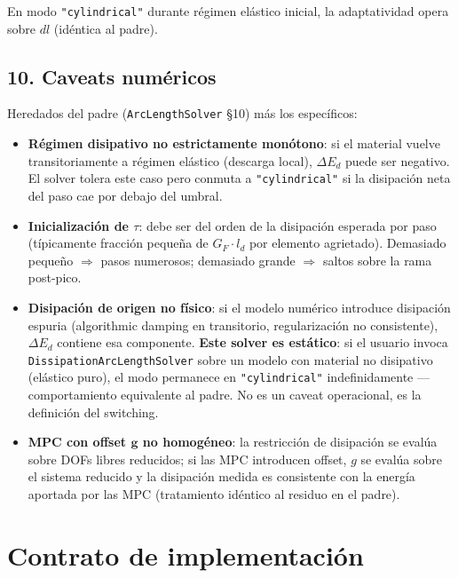 \documentclass[11pt,letterpaper,oneside]{report}
\begin{document}
En modo \texttt{"cylindrical"} durante régimen elástico inicial, la adaptatividad opera sobre $dl$ (idéntica al padre).

\subsection{10. Caveats numéricos}

Heredados del padre (\texttt{ArcLengthSolver} §10) más los específicos:

\begin{itemize}
  \item \textbf{Régimen disipativo no estrictamente monótono}: si el material vuelve transitoriamente a régimen elástico (descarga local), $\Delta E_d$ puede ser negativo. El solver tolera este caso pero conmuta a \texttt{"cylindrical"} si la disipación neta del paso cae por debajo del umbral.
  \item \textbf{Inicialización de $\tau$}: debe ser del orden de la disipación esperada por paso (típicamente fracción pequeña de $G_F \cdot l_d$ por elemento agrietado). Demasiado pequeño \ensuremath{\Rightarrow} pasos numerosos; demasiado grande \ensuremath{\Rightarrow} saltos sobre la rama post-pico.
  \item \textbf{Disipación de origen no físico}: si el modelo numérico introduce disipación espuria (algorithmic damping en transitorio, regularización no consistente), $\Delta E_d$ contiene esa componente. \textbf{Este solver es estático}: si el usuario invoca \texttt{DissipationArcLengthSolver} sobre un modelo con material no disipativo (elástico puro), el modo permanece en \texttt{"cylindrical"} indefinidamente --- comportamiento equivalente al padre. No es un caveat operacional, es la definición del switching.
  \item \textbf{MPC con offset $\mathbf g$ no homogéneo}: la restricción de disipación se evalúa sobre DOFs libres reducidos; si las MPC introducen offset, $g$ se evalúa sobre el sistema reducido y la disipación medida es consistente con la energía aportada por las MPC (tratamiento idéntico al residuo en el padre).
\end{itemize}


\section{Contrato de implementación}
\end{document}
